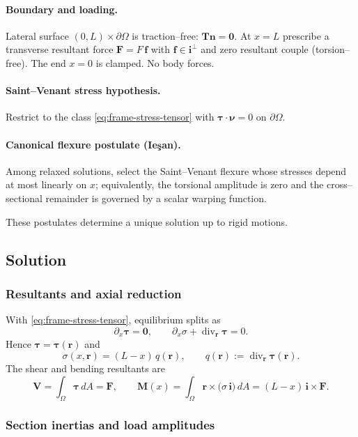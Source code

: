 \paragraph{Boundary and loading.}
Lateral surface $(0,L)\times\partial\Omega$ is traction–free: $\bm{T}\bm{n}=\mathbf{0}$. At $x=L$ prescribe a transverse resultant force $\bm{F}=F\,\bm{f}$ with $\bm{f}\in\mathbf{i}^\perp$ and zero resultant couple (torsion–free). The end $x=0$ is clamped. No body forces.

\paragraph{Saint–Venant stress hypothesis.}
Restrict to the class \eqref{eq:frame-stress-tensor} with $\bm{\tau}\cdot\bm{\nu}=0$ on $\partial\Omega$.

\paragraph{Canonical flexure postulate (Ieşan).}
Among relaxed solutions, select the Saint–Venant flexure whose stresses depend at most linearly on $x$; equivalently, the torsional amplitude is zero and the cross–sectional remainder is governed by a scalar warping function.

These postulates determine a unique solution up to rigid motions.

\subsection*{Solution}

\subsubsection*{Resultants and axial reduction}

With \eqref{eq:frame-stress-tensor}, equilibrium splits as
\[
\partial_x \bm{\tau}=\mathbf{0},\qquad
\partial_x \sigma+\operatorname{div}_{\bm{r}}\bm{\tau}=0.
\]
Hence $\bm{\tau}=\bm{\tau}(\bm{r})$ and
\begin{equation}
\sigma(x,\bm{r})=(L-x)\,q(\bm{r}),
\qquad
q(\bm{r}):=\operatorname{div}_{\bm{r}}\bm{\tau}(\bm{r}).
\label{eq:sigma-q}
\end{equation}
The shear and bending resultants are
\[
\bm{V}=\int_\Omega \bm{\tau}\,dA=\bm{F},\qquad
\bm{M}(x)=\int_\Omega \bm{r}\times\big(\sigma\,\mathbf{i}\big)\,dA=(L-x)\,\mathbf{i}\times\bm{F}.
\]

\subsubsection*{Section inertias and load amplitudes}

